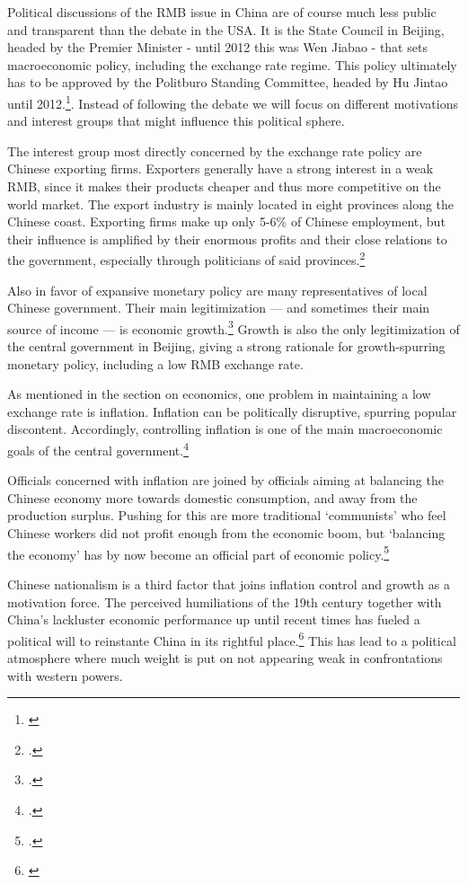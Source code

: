 Political discussions of the RMB issue in China are of course much less 
public and transparent than the debate in the USA. It is the State 
Council in Beijing, headed by the Premier Minister - until 2012 this was 
Wen Jiabao - that sets macroeconomic policy, including the exchange rate 
regime.  This policy ultimately has to be approved by the Politburo 
Standing Committee, headed by Hu Jintao until 
2012.\footnote{\cite{naughton2008}}. Instead of following the debate we 
will focus on different motivations and interest groups that might 
influence this political sphere.

The interest group most directly concerned by the exchange rate policy 
are Chinese exporting firms. Exporters generally have a strong interest 
in a weak RMB, since it makes their products cheaper and thus more 
competitive on the world market. The export industry is mainly located 
in eight provinces along the Chinese coast. Exporting firms make up only 
5-6\% of Chinese employment, but their influence is amplified by their 
enormous profits and their close relations to the government, especially 
through politicians of said provinces.\footnote{\cite[p.  
202]{Breslin2010}.} 

Also in favor of expansive monetary policy are many representatives of 
local Chinese government. Their main legitimization --- and sometimes 
their main source of income --- is economic growth.\footnote{\cite[pp.  
19]{Levy2011}.} Growth is also the only legitimization of the central 
government in Beijing, giving a strong rationale for growth-spurring 
monetary policy, including a low RMB exchange rate.

As mentioned in the section on economics, one problem in maintaining a 
low exchange rate is inflation. Inflation can be politically disruptive, 
spurring popular discontent. Accordingly, controlling inflation is one 
of the main macroeconomic goals of the central 
government.\footnote{\cite{Naugthon2011}.}

Officials concerned with inflation are joined by officials aiming at 
balancing the Chinese economy more towards domestic consumption, and 
away from the production surplus. Pushing for this are more traditional 
`communists' who feel Chinese workers did not profit enough from the 
economic boom, but `balancing the economy' has by now become an official 
part of economic policy.\footnote{\cite{Xinhua2011}.}

Chinese nationalism is a third factor that joins inflation control and 
growth as a motivation force. The perceived humiliations of the 19th 
century together with China's lackluster economic performance up until 
recent times has fueled a political will to reinstante China in its 
rightful place.\footnote{\cite{hughes2006}} This has lead to a political 
atmosphere where much weight is put on not appearing weak in 
confrontations with western powers.

